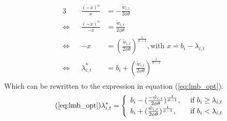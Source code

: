 \documentclass[../main.tex]{subfiles}
\begin{document}
\begin{alignat*}{3}
	{}				&& \frac{(-x)^\phi}{x} 					&= - \frac{\tilde{w}_{i,t}}{2 \phi \theta} \\
	\Leftrightarrow && \frac{(-x)^\phi}{-x} 				&= \frac{\tilde{w}_{i,t}}{2 \phi \theta} \\
	\Leftrightarrow && - x 									&= (\frac{\tilde{w}_{i,t}}{2 \phi \theta})^\frac{1}{\phi-1}, \text{with $x = b_i - \lambda_{i,t}$} \\
	\Leftrightarrow && \lambda^*_{i,t}						&= b_i + (\frac{\tilde{w}_{i,t}}{2 \phi \theta})^\frac{1}{\phi-1} \\
\end{alignat*}
Which can be rewritten to the expression in equation (\ref{eq:lmb_opt}):
\begin{equation} \tag{\ref{eq:lmb_opt}}
	\lambda^*_{i,t} = \left\{
	\begin{array}{ll}
		b_i - (\frac{- \tilde{w}_{i,t}}{2 \phi \theta})^{\frac{1}{\phi -1}}, \: & \: \text{if $b_i \geq \lambda_{i,t}$}\\
		b_i + (\frac{\tilde{w}_{i,t}}{2 \phi \theta})^{\frac{1}{\phi - 1}}, \: & \: \text{if $b_i < \lambda_{i,t}$}
	\end{array}
\right.
\end{equation}
\end{document}
